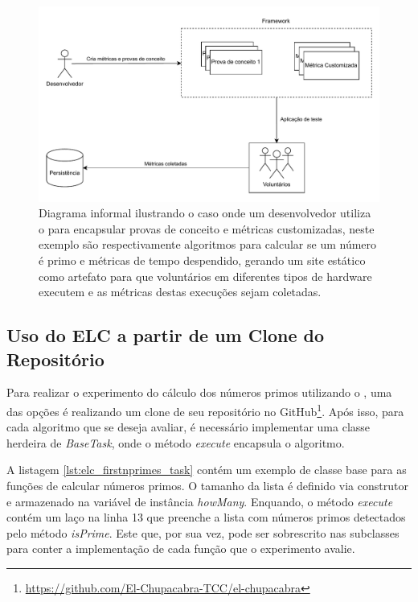 \documentclass[12pt]{tcc}
\begin{document}
	\begin{figure}[!ht]
		\centering
		\includegraphics[width=\textwidth]{figures/diagrama-informal.pdf}
		\caption{Diagrama informal ilustrando o caso onde um desenvolvedor utiliza o  para encapsular provas de conceito e métricas customizadas, neste exemplo são respectivamente algoritmos para calcular se um número é primo e métricas de tempo despendido, gerando um site estático como artefato para que voluntários em diferentes tipos de hardware executem e as métricas destas execuções sejam coletadas.}
		\label{fig:diagrama-informal}
	\end{figure}

	\subsection{Uso do ELC a partir de um Clone do Repositório}
	\label{subsection:study-case-cloning-elc}

	Para realizar o experimento do cálculo dos números primos utilizando o , uma das opções é realizando um clone de seu repositório no GitHub\footnote{\url{https://github.com/El-Chupacabra-TCC/el-chupacabra}}.
	Após isso, para cada algoritmo que se deseja avaliar, é necessário implementar uma classe herdeira de \emph{BaseTask}, onde o método \emph{execute} encapsula o algoritmo.

	A listagem \ref{lst:elc_firstnprimes_task} contém um exemplo de classe base para as funções de calcular números primos.
	O tamanho da lista é definido via construtor e armazenado na variável de instância \emph{howMany}.
	Enquando, o método \emph{execute} contém um laço na linha 13 que preenche a lista com números primos detectados pelo método \emph{isPrime}.
	Este que, por sua vez, pode ser sobrescrito nas subclasses para conter a implementação de cada função que o experimento avalie.
\end{document}
